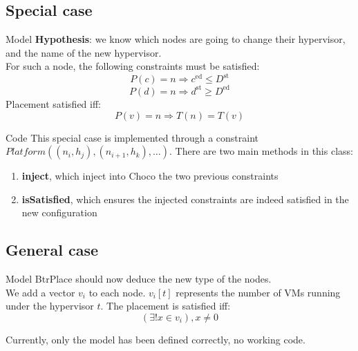 \documentclass{beamer}
\begin{document}
\subsection{Special case}
\begin{frame}{Model}
\textbf{Hypothesis}: we know which nodes are going to change their hypervisor,
and the name of the new hypervisor.\\
\pause For such a node, the following constraints must be satisfied:
\[
	P(c) = n \Rightarrow c^\mathrm{ed} \leq D^\mathrm{st}
\]
\[
	P(d) = n \Rightarrow d^\mathrm{st} \geq D^\mathrm{ed}
\]
\pause Placement satisfied iff:
\[
	P(v) = n \Rightarrow T(n) = T(v)	
\]

\end{frame}
\begin{frame}{Code}
This special case is implemented through a constraint
$Platform((n_i, h_j), (n_{i+1}, h_k), \ldots)$.
There are two main methods in this class:
\begin{enumerate}
	\item{\textbf{inject}}, which inject into Choco the two previous
		constraints
	\item{\textbf{isSatisfied}}, which ensures the injected constraints
		are indeed satisfied in the new configuration
\end{enumerate}
\end{frame}

\subsection{General case}
\begin{frame}{Model}
BtrPlace should now deduce the new type of the nodes.\\
We add a vector $v_i$ to each node. $v_i[t]$ represents the number
of VMs running under the hypervisor $t$.
\pause The placement is satisfied iff:
\[
	(\exists ! x \in v_i), x \neq 0
\]

Currently, only the model has been defined correctly, no working code.
\end{frame}

\end{document}
